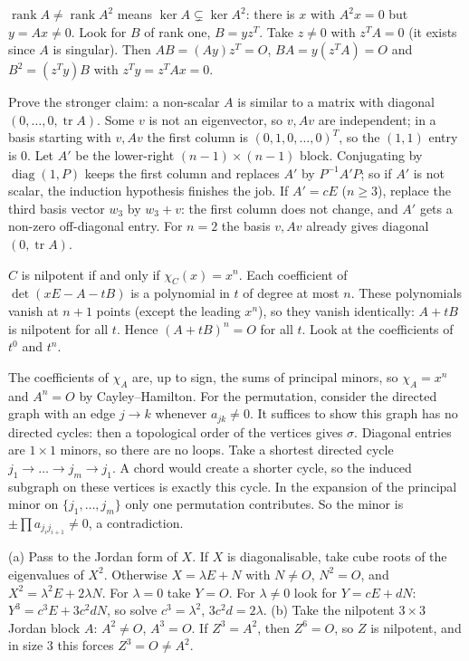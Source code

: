 \documentclass[11pt,a4paper]{article}
\begin{document}
\(\operatorname{rank}A\ne\operatorname{rank}A^2\) means \(\ker A\subsetneq\ker A^2\): there is \(x\) with \(A^2x=0\) but \(y=Ax\ne0\). Look for \(B\) of rank one, \(B=yz^T\).
Take \(z\ne0\) with \(z^TA=0\) (it exists since \(A\) is singular). Then \(AB=(Ay)z^T=O\), \(BA=y(z^TA)=O\) and \(B^2=(z^Ty)B\) with \(z^Ty=z^TAx=0\).

Prove the stronger claim: a non-scalar \(A\) is similar to a matrix with diagonal \((0,\dots,0,\operatorname{tr}A)\). Some \(v\) is not an eigenvector, so \(v,Av\) are independent; in a basis starting with \(v,Av\) the first column is \((0,1,0,\dots,0)^T\), so the \((1,1)\) entry is \(0\).
Let \(A'\) be the lower-right \((n-1)\times(n-1)\) block. Conjugating by \(\operatorname{diag}(1,P)\) keeps the first column and replaces \(A'\) by \(P^{-1}A'P\); so if \(A'\) is not scalar, the induction hypothesis finishes the job.
If \(A'=cE\) (\(n\ge3\)), replace the third basis vector \(w_3\) by \(w_3+v\): the first column does not change, and \(A'\) gets a non-zero off-diagonal entry. For \(n=2\) the basis \(v,Av\) already gives diagonal \((0,\operatorname{tr}A)\).

\(C\) is nilpotent if and only if \(\chi_C(x)=x^n\). Each coefficient of \(\det(xE-A-tB)\) is a polynomial in \(t\) of degree at most \(n\).
These polynomials vanish at \(n+1\) points (except the leading \(x^n\)), so they vanish identically: \(A+tB\) is nilpotent for all \(t\). Hence \((A+tB)^n=O\) for all \(t\). Look at the coefficients of \(t^0\) and \(t^n\).

The coefficients of \(\chi_A\) are, up to sign, the sums of principal minors, so \(\chi_A=x^n\) and \(A^n=O\) by Cayley--Hamilton. For the permutation, consider the directed graph with an edge \(j\to k\) whenever \(a_{jk}\ne0\).
It suffices to show this graph has no directed cycles: then a topological order of the vertices gives \(\sigma\). Diagonal entries are \(1\times1\) minors, so there are no loops.
Take a shortest directed cycle \(j_1\to\dots\to j_m\to j_1\). A chord would create a shorter cycle, so the induced subgraph on these vertices is exactly this cycle. In the expansion of the principal minor on \(\{j_1,\dots,j_m\}\) only one permutation contributes. So the minor is \(\pm\prod a_{j_ij_{i+1}}\ne0\), a contradiction.

(a) Pass to the Jordan form of \(X\). If \(X\) is diagonalisable, take cube roots of the eigenvalues of \(X^2\). Otherwise \(X=\lambda E+N\) with \(N\ne O\), \(N^2=O\), and \(X^2=\lambda^2E+2\lambda N\).
For \(\lambda=0\) take \(Y=O\). For \(\lambda\ne0\) look for \(Y=cE+dN\): \(Y^3=c^3E+3c^2dN\), so solve \(c^3=\lambda^2\), \(3c^2d=2\lambda\).
(b) Take the nilpotent \(3\times3\) Jordan block \(A\): \(A^2\ne O\), \(A^3=O\). If \(Z^3=A^2\), then \(Z^6=O\), so \(Z\) is nilpotent, and in size \(3\) this forces \(Z^3=O\ne A^2\).
\end{document}
